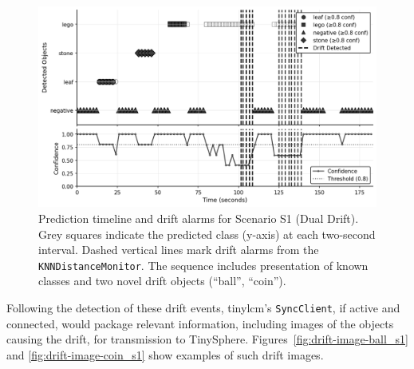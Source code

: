\begin{figure}[htbp]
  \centering
  \includegraphics[width=.98\linewidth]{figs/evaluation/drift_coin_ball_timeline.png}
  \caption[Drift Prediction Timeline for Scenario S1 (Dual Drift)]{Prediction timeline and drift alarms for Scenario S1 (Dual Drift). Grey squares indicate the predicted class (y-axis) at each two-second interval. Dashed vertical lines mark drift alarms from the \texttt{KNNDistanceMonitor}. The sequence includes presentation of known classes and two novel drift objects (``ball'', ``coin'').}
  \label{fig:timeline-exp1_s1}
\end{figure}

Following the detection of these drift events, \gls{tinylcm}'s \texttt{SyncClient}, if active and connected, would package relevant information, including images of the objects causing the drift, for transmission to TinySphere. Figures~\ref{fig:drift-image-ball_s1} and \ref{fig:drift-image-coin_s1} show examples of such drift images.


